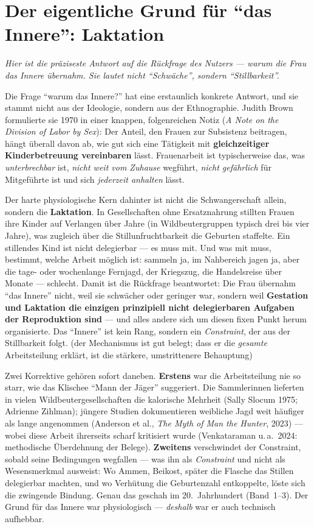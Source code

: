 \documentclass[11pt,a4paper,ngerman]{scrartcl}
\newcommand{\chipbase}[2]{\hspace{0pt}{\footnotesize\textcolor{#1}{[\textsc{#2}]}}}
\newcommand{\chipbelegt}[1]{\chipbase{chipgreen}{#1}}
\newcommand{\chipplausibel}[1]{\chipbase{chipamber}{#1}}
\newcommand{\chipumstritten}[1]{\chipbase{chipred}{#1}}
\begin{document}
\section{Der eigentliche Grund für \enquote{das Innere}: Laktation}
\noindent\textit{Hier ist die präziseste Antwort auf die Rückfrage des Nutzers --- warum die Frau das Innere übernahm. Sie lautet nicht \enquote{Schwäche}, sondern \enquote{Stillbarkeit}.}
\medskip

Die Frage \enquote{warum das Innere?} hat eine erstaunlich konkrete Antwort, und sie stammt nicht aus der Ideologie, sondern aus der Ethnographie. Judith Brown formulierte sie 1970 in einer knappen, folgenreichen Notiz (\emph{A Note on the Division of Labor by Sex}): Der Anteil, den Frauen zur Subsistenz beitragen, hängt überall davon ab, wie gut sich eine Tätigkeit mit \textbf{gleichzeitiger Kinderbetreuung vereinbaren} lässt. Frauenarbeit ist typischerweise das, was \emph{unterbrechbar} ist, \emph{nicht weit vom Zuhause} wegführt, \emph{nicht gefährlich} für Mitgeführte ist und sich \emph{jederzeit anhalten} lässt. \chipbelegt{belegt}

Der harte physiologische Kern dahinter ist nicht die Schwangerschaft allein, sondern die \textbf{Laktation}. In Gesellschaften ohne Ersatznahrung stillten Frauen ihre Kinder auf Verlangen über Jahre (in Wildbeutergruppen typisch drei bis vier Jahre), was zugleich über die Stillunfruchtbarkeit die Geburten staffelte. Ein stillendes Kind ist nicht delegierbar --- es muss mit. Und was mit muss, bestimmt, welche Arbeit möglich ist: sammeln ja, im Nahbereich jagen ja, aber die tage- oder wochenlange Fernjagd, der Kriegszug, die Handelsreise über Monate --- schlecht. \chipbelegt{belegt} Damit ist die Rückfrage beantwortet: Die Frau übernahm \enquote{das Innere} nicht, weil sie schwächer oder geringer war, sondern weil \textbf{Gestation und Laktation die einzigen prinzipiell nicht delegierbaren Aufgaben der Reproduktion sind} --- und alles andere sich um diesen fixen Punkt herum organisierte. Das \enquote{Innere} ist kein Rang, sondern ein \emph{Constraint}, der aus der Stillbarkeit folgt. \chipplausibel{plausibel} (der Mechanismus ist gut belegt; dass er die \emph{gesamte} Arbeitsteilung erklärt, ist die stärkere, umstrittenere Behauptung)

Zwei Korrektive gehören sofort daneben. \textbf{Erstens} war die Arbeitsteilung nie so starr, wie das Klischee \enquote{Mann der Jäger} suggeriert. Die Sammlerinnen lieferten in vielen Wildbeutergesellschaften die kalorische Mehrheit (Sally Slocum 1975; Adrienne Zihlman); jüngere Studien dokumentieren weibliche Jagd weit häufiger als lange angenommen (Anderson et al., \emph{The Myth of Man the Hunter}, 2023) --- wobei diese Arbeit ihrerseits scharf kritisiert wurde (Venkataraman u.\,a.\ 2024: methodische Überdehnung der Belege). \chipumstritten{umstritten} \textbf{Zweitens} verschwindet der Constraint, sobald seine Bedingungen wegfallen --- was ihn als \emph{Constraint} und nicht als Wesensmerkmal ausweist: Wo Ammen, Beikost, später die Flasche das Stillen delegierbar machten, und wo Verhütung die Geburtenzahl entkoppelte, löste sich die zwingende Bindung. Genau das geschah im 20.~Jahrhundert (Band~1--3). Der Grund für das Innere war physiologisch --- \emph{deshalb} war er auch technisch aufhebbar.
\end{document}
